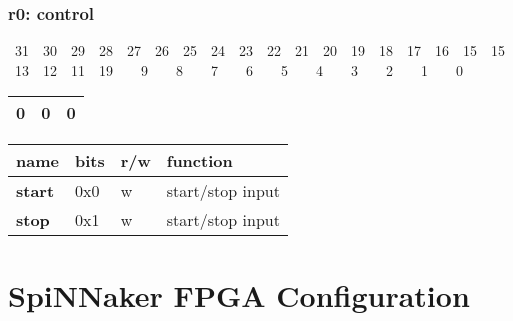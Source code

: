 \documentclass[11pt,a4paper,twoside]{article}
\begin{document}
\subsubsection*{\textbf{r0: control}}

{\footnotesize
~31~~30~~29~~28~~27~~26~~25~~24~~23~~22~~21~~20~~19~~18~~17~~16~~15~~15~~13~~12~~11~~19~~~~9~~~~8~~~~7~~~~6~~~~5~~~~4~~~~3~~~~2~~~~1~~~~0
}

\noindent
\begin{tabularx}{\linewidth}{| p{} | p{} | p{} |}
	\hline
	0             & 0            & 0  \\%
	\hline
\end{tabularx}


\begin{center}
	\renewcommand{\arraystretch}{1.2}
	\begin{tabularx}{\textwidth}{| p{\ncw} p{\ocw} p{\rcw} X |}
		\hline
		\textbf{name}    & \textbf{bits} & \textbf{r/w} & \textbf{function} \\%
		\hline
		\hline
		\textbf{start}   & 0x0           & w            & start/stop input  \\%
		\textbf{stop}    & 0x1           & w            & start/stop input  \\%
		\hline
	\end{tabularx}
\end{center}


\section{SpiNNaker FPGA Configuration}
\end{document}
